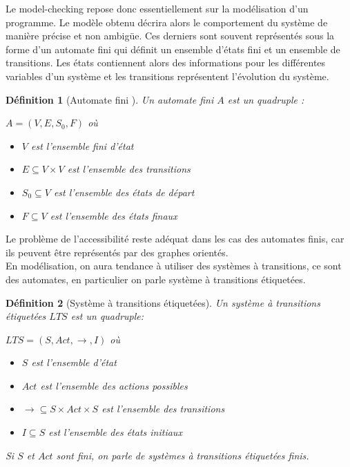 \documentclass[a4paper]{report}
\theoremstyle{break}
\newtheorem{defin}{Définition}
\begin{document}
Le model-checking repose donc essentiellement sur la modélisation d'un programme. Le modèle obtenu décrira alors le comportement du système de manière précise et non ambigüe. Ces derniers sont souvent représentés sous la forme d'un automate fini qui définit un ensemble d'états fini et un ensemble de transitions. Les états contiennent alors des informations pour les différentes variables d'un système et les transitions représentent l'évolution du système.
\begin{defin}[Automate fini \cite{geeraerts2013multiprocessor}]
Un automate fini $A$ est un quadruple :
\begin{center}
$A=(V,E,S_0,F)$ où
\end{center}
\begin{itemize}
\item $V$ est l'ensemble fini d'état
\item $E \subseteq V \times V$ est l'ensemble des transitions
\item $S_0 \subseteq V$ est l'ensemble des états de départ
\item $F \subseteq V$ est l'ensemble des états finaux
\end{itemize}
\end{defin}

Le problème de l'accessibilité reste adéquat dans les cas des automates finis, car ils peuvent être représentés par des graphes orientés.\\

En modélisation, on aura tendance à utiliser des systèmes à transitions, ce sont des automates, en particulier on parle système à transitions étiquetées.

\begin{defin}[Système à transitions étiquetées]
Un système à transitions étiquetées $LTS$ est un quadruple:
\begin{center}
$LTS = (S, Act, \rightarrow, I)$ où
\end{center}
\begin{itemize}
\item $S$ est l'ensemble d'état
\item $Act$ est l'ensemble des actions possibles
\item $\rightarrow \subseteq S \times Act \times S$ est l'ensemble des transitions
\item $I \subseteq S$ est l'ensemble des états initiaux
\end{itemize}
Si $S$ et $Act$ sont fini, on parle de systèmes à transitions étiquetées finis.
\end{defin}
\end{document}
